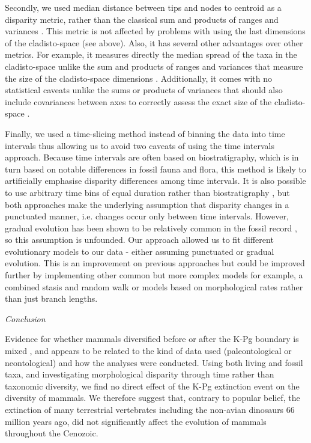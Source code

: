\documentclass[12pt,letterpaper]{article}
\renewcommand{\subsection}[1]{%
\bigskip
\begin{center}
\begin{large}
\normalfont\itshape #1
\end{large}
\end{center}}
\begin{document}
Secondly, we used median distance between tips and nodes to centroid as a disparity metric, rather than the classical sum and products of ranges and variances \citep{Wills1994}.
This metric is not affected by problems with using the last dimensions of the cladisto-space (see above).
Also, it has several other advantages over other metrics.
For example, it measures directly the median spread of the taxa in the cladisto-space unlike the sum and products of ranges and variances that measure the size of the cladisto-space dimensions \citep{Wills1994}.
Additionally, it comes with no statistical caveats unlike the sums or products of variances that should also include covariances between axes to correctly assess the exact size of the cladisto-space \citep[even though the covariance term is usually close to 0 because of the eigen decomposition;][]{GOWER01121966}.

Finally, we used a time-slicing method instead of binning the data into time intervals \citep[e.g in:][]{cisneros2010,prentice2011,Hughes20082013,hopkinsdecoupling2013,bentonmodels2014,bensonfaunal2014} thus allowing us to avoid two caveats of using the time intervals approach.
Because time intervals are often based on biostratigraphy, which is in turn based on notable differences in fossil fauna and flora, this method is likely to artificially emphasise disparity differences among time intervals.
It is also possible to use arbitrary time bins of equal duration rather than biostratigraphy \citep{Butler2012,hopkinsdecoupling2013,bensonfaunal2014}, but both approaches make the underlying assumption that disparity changes in a punctuated  manner, i.e. changes occur only between time intervals.
However, gradual evolution has been shown to be relatively common in the fossil record \citep{Hunt20112007,Hunt21042015}, so this assumption is unfounded.
Our approach allowed us to fit different evolutionary models to our data - either assuming punctuated or gradual evolution.
This is an improvement on previous approaches but could be improved further by implementing other common but more complex models for example, a combined stasis and random walk \citep{Hunt21042015} or models based on morphological rates rather than just branch lengths.

\subsection{Conclusion}
Evidence for whether mammals diversified before or after the K-Pg boundary is mixed \citep{meredithimpacts2011,OLeary08022013,dosReis2014,beckancient2014}, and appears to be related to the kind of data used (paleontological or neontological) and how the analyses were conducted.
Using both living and fossil taxa, and investigating morphological disparity through time rather than taxonomic diversity, we find no direct effect of the K-Pg extinction event on the diversity of mammals. 
We therefore suggest that, contrary to popular belief, the extinction of many terrestrial vertebrates including the non-avian dinosaurs 66 million years ago, did not significantly affect the evolution of mammals throughout the Cenozoic.
\end{document}
